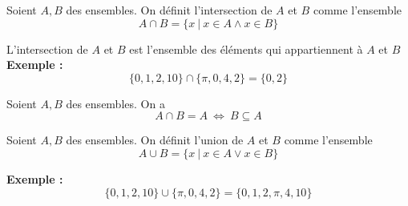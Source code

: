 \begin{definition}[Intersection]
    Soient $A,B$ des ensembles. On définit l'intersection de $A$ et $B$ comme l'ensemble
    \[
    A\cap B=\{x\: |\: x\in A \wedge x\in B\}
    \]
\end{definition}
L'intersection de $A$ et $B$ est l'ensemble des éléments qui appartiennent à $A$ et $B$\\
\textbf{Exemple :}\\
\[
\{0,1,2,10\}\cap\{\pi,0,4,2\}=\{0,2\}
\]
\begin{center}
\end{center}
\begin{remarque}
    Soient $A,B$ des ensembles. On a
    \[
    A\cap B=A \: \Leftrightarrow \: B\subseteq A
    \]
\end{remarque}

    \begin{definition}[Union]
        Soient $A,B$ des ensembles. On définit l'union de $A$ et $B$ comme l'ensemble
        \[
        A\cup B=\{x\:|\: x\in A \vee x\in B\}
        \]
    \end{definition}
\textbf{Exemple :}\\
\[
\{0,1,2,10\}\cup\{\pi,0,4,2\}=\{0,1,2,\pi,4,10\}
\]

\begin{center}
\end{center}

